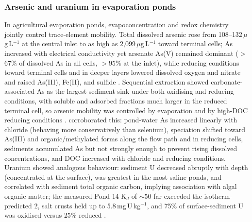 \documentclass[11pt]{article}
\begin{document}
\subsubsection{Arsenic and uranium in evaporation ponds}
In agricultural evaporation ponds, evapoconcentration and redox chemistry jointly control trace-element mobility. Total dissolved arsenic rose from 108--132\,$\mu$g\,L$^{-1}$ at the central inlet to as high as 2{,}099\,$\mu$g\,L$^{-1}$ toward terminal cells; As increased with electrical conductivity yet arsenate As(V) remained dominant ($>$67\% of dissolved As in all cells, $>$95\% at the inlet), while reducing conditions toward terminal cells and in deeper layers lowered dissolved oxygen and nitrate and raised As(III), Fe(II), and sulfide \parencite{Ryu2010}. Sequential extraction showed carbonate-associated As as the largest sediment sink under both oxidising and reducing conditions, with soluble and adsorbed fractions much larger in the reduced terminal cell, so arsenic mobility was controlled by evaporation and by high-DOC reducing conditions \parencite{Ryu2010}. \textcite{Gao2007} corroborated this: pond-water As increased linearly with chloride (behaving more conservatively than selenium), speciation shifted toward As(III) and organic/methylated forms along the flow path and in reducing cells, sediments accumulated As but not strongly enough to prevent rising dissolved concentrations, and DOC increased with chloride and reducing conditions. Uranium showed analogous behaviour: sediment U decreased abruptly with depth (concentrated at the surface), was greatest in the most saline ponds, and correlated with sediment total organic carbon, implying association with algal organic matter; the measured Pond-14 K$_d$ of $\sim$50 far exceeded the isotherm-predicted 2, salt crusts held up to 5.8\,mg\,U\,kg$^{-1}$, and 75\% of surface-sediment U was oxidised versus 25\% reduced \parencite{Duff1997}.
\end{document}

